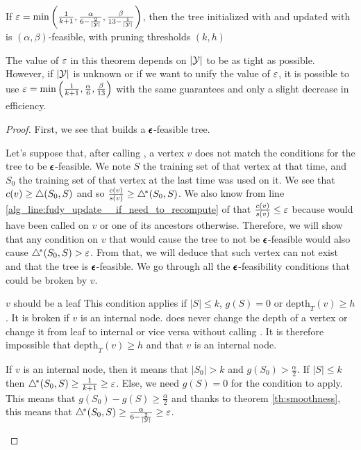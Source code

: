 \begin{theorem}\label{th:fudy_is_epsfeasible}
    If $\varepsilon=\min\left(\frac{1}{k+1}, \frac{\alpha}{6-\frac{2}{|\mathcal{Y}|}}, \frac{\beta}{13 - \frac{1}{|\mathcal{Y}|}}\right)$, then the tree initialized with \AlgoBuild{} and updated with \AlgoUpdate{} is $(\alpha, \beta)$-feasible, with pruning thresholds $(k, h)$
\end{theorem}
The value of $\varepsilon$ in this theorem depends on $|\mathcal{Y}|$ to be as tight as possible. However, if $|\mathcal{Y}|$ is unknown or if we want to unify the value of $\varepsilon$, it is possible to use $\varepsilon=\min\left(\frac{1}{k+1}, \frac{\alpha}{6}, \frac{\beta}{13}\right)$ with the same guarantees and only a slight decrease in efficiency.
\begin{proof}
    First, we see that \AlgoBuild{} builds a $\pmb{\epsilon}$-feasible tree. 
    
    Let's suppose that, after calling \AlgoUpdate{}, a vertex $v$ does not match the conditions for the tree to be $\pmb{\epsilon}$-feasible. We note $S$ the training set of that vertex at that time, and $S_0$ the training set of that vertex at the last time \AlgoBuild{} was used on it. We see that $c(v) \geq \triangle(S_0, S)$ and so $\frac{c(v)}{s(v)} \geq \triangle^{\!*}(S_0, S)$. We also know from line \ref{alg_line:fudy_update__if_need_to_recompute} of \AlgoUpdate{} that   $\frac{c(v)}{s(v)} \leq \varepsilon$ because \AlgoBuild{} would have been called on $v$ or one of its ancestors otherwise. Therefore, we will show that any condition on $v$ that would cause the tree to not be $\pmb{\epsilon}$-feasible would also cause $\triangle^{\!*}(S_0, S) > \varepsilon$. From that, we will deduce that such vertex can not exist and that the tree is $\pmb{\epsilon}$-feasible. We go through all the $\pmb{\epsilon}$-feasibility conditions that could be broken by $v$.

    \begin{paragraph}{$v$ should be a leaf}
        This condition applies if $|S|\leq k$, $g(S) = 0$ or $\text{depth}_T(v) \geq h$. It is broken if $v$ is an internal node. \AlgoUpdate{} does never change the depth of a vertex or change it from leaf to internal or vice versa without calling \AlgoBuild{}. It is therefore impossible that $\text{depth}_T(v) \geq h$ and that $v$ is an internal node.

        If $v$ is an internal node, then it means that $|S_0| > k$ and $g(S_0) > \frac{\alpha}{2}$. If $|S| \leq k$ then $\triangle^{\!*}(S_0, S) \geq \frac{1}{k+1} \geq \varepsilon$. Else, we need $g(S) = 0 $ for the condition to apply. This means that $g(S_0) - g(S) \geq \frac{\alpha}{2}$ and thanks to theorem \ref{th:smoothness}, this means that $\triangle^{\!*}(S_0, S) \geq \frac{\alpha}{6 - \frac{2}{|\mathcal{Y}|}} \geq \varepsilon$.
    \end{paragraph}


\end{proof}
